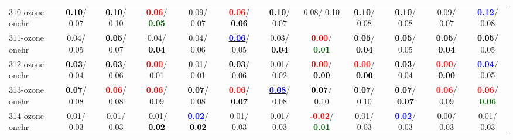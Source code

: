 \begin{table}[h]
\begin{center}
{\begin{tabular}{lc|c|c|c|c|c|c|c|c|c|c}
310-ozone onehr & \textcolor{black}{\textbf{  0.10}}/  0.07 & \textcolor{black}{\textbf{  0.10}}/  0.10 & \textcolor{red}{\textbf{  0.06}}/\textcolor{darkgreen}{\textbf{  0.05}} &   0.09/  0.07 & \textcolor{red}{\textbf{  0.06}}/\textcolor{black}{\textbf{  0.06}} & \textcolor{black}{\textbf{  0.10}}/  0.07 &   0.08/  0.10 & \textcolor{black}{\textbf{  0.10}}/  0.08 & \textcolor{black}{\textbf{  0.10}}/  0.08 &   0.09/  0.07 & \underline{\textcolor{blue}{\textbf{  0.12}}}/  0.08 \\
311-ozone onehr &   0.04/  0.05 & \textcolor{black}{\textbf{  0.05}}/  0.07 &   0.04/\textcolor{black}{\textbf{  0.04}} &   0.04/  0.06 & \underline{\textcolor{blue}{\textbf{  0.06}}}/  0.05 &   0.03/\textcolor{black}{\textbf{  0.04}} & \textcolor{red}{\textbf{  0.00}}/\textcolor{darkgreen}{\textbf{  0.01}} & \textcolor{black}{\textbf{  0.05}}/\textcolor{black}{\textbf{  0.04}} & \textcolor{black}{\textbf{  0.05}}/  0.05 & \textcolor{black}{\textbf{  0.05}}/\textcolor{black}{\textbf{  0.04}} & \textcolor{black}{\textbf{  0.05}}/  0.05 \\
312-ozone onehr & \textcolor{black}{\textbf{  0.03}}/  0.04 & \textcolor{black}{\textbf{  0.03}}/  0.06 & \textcolor{red}{\textbf{  0.00}}/  0.01 &   0.01/  0.01 & \textcolor{black}{\textbf{  0.03}}/  0.06 &   0.01/  0.02 & \textcolor{red}{\textbf{  0.00}}/\textcolor{black}{\textbf{  0.00}} & \textcolor{red}{\textbf{  0.00}}/\textcolor{black}{\textbf{  0.00}} & \textcolor{black}{\textbf{  0.03}}/  0.04 & \textcolor{red}{\textbf{  0.00}}/\textcolor{black}{\textbf{  0.00}} & \underline{\textcolor{blue}{\textbf{  0.04}}}/  0.05 \\
313-ozone onehr & \textcolor{black}{\textbf{  0.07}}/  0.08 & \textcolor{red}{\textbf{  0.06}}/  0.08 & \textcolor{red}{\textbf{  0.06}}/  0.09 & \textcolor{black}{\textbf{  0.07}}/  0.08 & \textcolor{red}{\textbf{  0.06}}/\textcolor{black}{\textbf{  0.07}} & \underline{\textcolor{blue}{\textbf{  0.08}}}/  0.08 & \textcolor{black}{\textbf{  0.07}}/  0.10 & \textcolor{black}{\textbf{  0.07}}/  0.10 & \textcolor{black}{\textbf{  0.07}}/\textcolor{black}{\textbf{  0.07}} & \textcolor{red}{\textbf{  0.06}}/  0.09 & \textcolor{red}{\textbf{  0.06}}/\textcolor{darkgreen}{\textbf{  0.06}} \\
314-ozone onehr &   0.01/  0.03 &   0.01/  0.03 &  -0.01/\textcolor{black}{\textbf{  0.02}} & \textcolor{blue}{\textbf{  0.02}}/\textcolor{black}{\textbf{  0.02}} &   0.01/  0.03 &   0.01/  0.03 & \textcolor{red}{\textbf{ -0.02}}/\textcolor{darkgreen}{\textbf{  0.01}} &   0.01/  0.03 & \textcolor{blue}{\textbf{  0.02}}/  0.03 &   0.00/  0.03 &   0.01/  0.03 \\

\end{tabular}}
\end{center}
\end{table}
